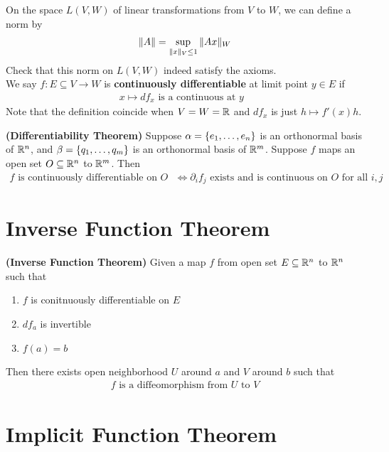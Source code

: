 \documentclass{report}
\begin{document}
\begin{mdframed}
On the space $L(V,W)$ of linear transformations from $V$ to $W$, we can define a norm by 
\begin{align*}
\| A \|=\sup_{\| x \|_V\leq 1} \| Ax \|_W
\end{align*}
Check that this norm on $L(V,W)$ indeed satisfy the axioms.\\

We say $f:E\subseteq V\rightarrow W$ is \textbf{continuously differentiable} at limit point $y\in E$ if 
\begin{align*}
x\mapsto df_x\text{ is a continuous at $y$ }
\end{align*}
Note that the definition coincide when $V=W=\mathbb{R}$ and $df_x$ is just  $h\mapsto f'(x)h$.  
\end{mdframed}
\begin{theorem}
\textbf{(Differentiability Theorem)} Suppose  $\alpha =\{ e_1,\dots ,e_n \}$ is an orthonormal basis of $\mathbb{R}^n$, and $\beta =\{ q_1,\dots ,q_m \}$ is an orthonormal basis of  $\mathbb{R}^m$. Suppose  $f$ maps an open set $O\subseteq\mathbb{R}^n$ to $\mathbb{R}^m$.  Then  
\begin{align*}
f\text{ is continuously differentiable on $O$ }\iff \partial_if_j\text{ exists and is continuous on $O$ for all $i,j$ }
\end{align*}
\end{theorem}



\section{Inverse Function Theorem}
\begin{theorem}
\textbf{(Inverse Function Theorem)} Given a map $f$ from open set $E\subseteq \mathbb{R}^n$ to $\mathbb{R}^n $ such that 
\begin{enumerate}[label=(\alph*)]
  \item $f$ is conitnuously differentiable on $E$ 
   \item $df_a$ is invertible  
  \item $f(a)=b$
\end{enumerate}
Then there exists open neighborhood $U$ around $a$ and  $V$ around  $b$ such that  
\begin{align*}
f\text{ is a diffeomorphism from $U$ to  $V$}
\end{align*}
\end{theorem}
\section{Implicit Function Theorem}
\end{document}

